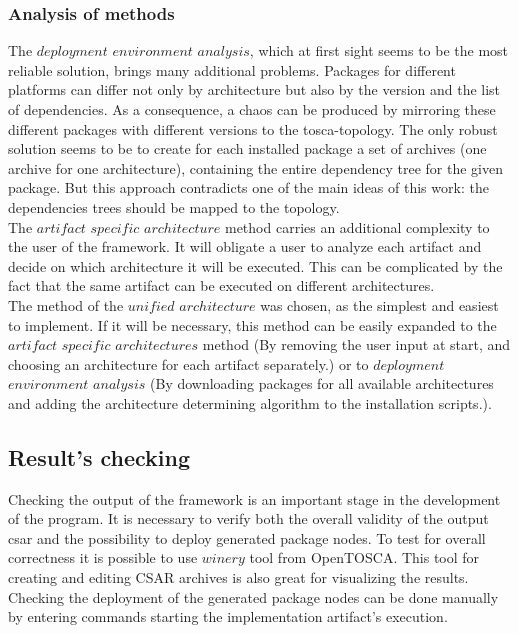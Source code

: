 \subsubsection*{Analysis of methods}
The $deployment$ $environment$ $analysis$, which at first sight seems to be the most reliable solution, brings many additional problems.
Packages for different platforms can differ not only by architecture but also by the version and the list of dependencies.
As a consequence, a chaos can be produced by mirroring these different packages with different versions to the \gls{tosca}-topology.
The only robust solution seems to be to create for each installed package a set of archives (one archive for one architecture), containing the entire dependency tree for the given package.
But this approach contradicts one of the main ideas of this work: the dependencies trees should be mapped to the topology.\\
The $artifact$ $specific$ $architecture$ method carries an additional complexity to the user of the framework.
It will obligate a user to analyze each artifact and decide on which architecture it will be executed. 
This can be complicated by the fact that the same artifact can be executed on different architectures.\\
The method of the $unified$ $architecture$ was chosen, as the simplest and easiest to implement.
If it will be necessary, this method can be easily expanded to the $artifact$ $specific$ $architectures$ method (By removing the user input at start, and choosing an architecture for each artifact separately.) or to $deployment$ $environment$ $analysis$ (By downloading packages for all available architectures and adding the architecture determining algorithm to the installation scripts.).

%

\subsection{Result's checking}
Checking the output of the framework is an important stage in the development of the program.
It is necessary to verify both the overall validity of the output \gls{csar} and the possibility to deploy generated package nodes.
To test for overall correctness it is possible to use $winery$ tool from OpenTOSCA.
This tool for creating and editing CSAR archives is also great for visualizing the results.
Checking the deployment of the generated package nodes can be done manually by entering commands starting the implementation artifact's execution.

